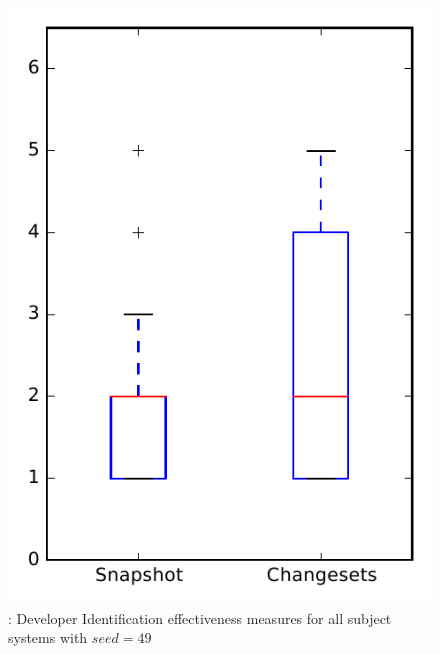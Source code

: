 
\begin{figure}
\centering
\includegraphics[height=0.4\textheight]{figures/dit_seed/rq1_overview_49}
\caption{\rtwo: Developer Identification effectiveness measures for all subject systems with $seed=49$}
\label{fig:dit_seed:rq1:overview}
\end{figure}
